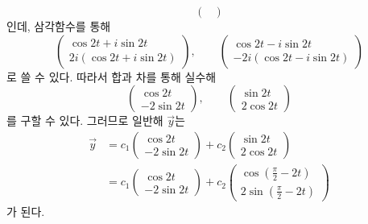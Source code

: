 \documentclass[../engineering_mathematics_lecture_note.tex]{subfiles}
\begin{document}
\begin{enumerate}
\begin{equation*}
\begin{pmatrix}
            \end{pmatrix}
        \end{equation*}
        인데, 삼각함수를 통해
        \begin{equation*}
            \begin{pmatrix}
                \cos 2t + i \sin 2t\\
                2i(\cos 2t + i \sin 2t)
            \end{pmatrix}, \qquad \begin{pmatrix}
                \cos 2t - i \sin 2t\\
                -2i (\cos 2t - i \sin 2t)
            \end{pmatrix}
        \end{equation*}
        로 쓸 수 있다.
        따라서 합과 차를 통해 실수해
        \begin{equation*}
            \begin{pmatrix}
                \cos 2t\\
                -2 \sin 2t
            \end{pmatrix}, \qquad \begin{pmatrix}
                \sin 2t\\
                2\cos 2t
            \end{pmatrix}
        \end{equation*}
        를 구할 수 있다.
        그러므로 일반해 $\vec y$는
        \begin{align*}
            \vec y &= c_1 \begin{pmatrix}
                \cos 2t\\ -2 \sin 2t
            \end{pmatrix} + c_2 \begin{pmatrix}
                \sin 2t\\ 2 \cos 2t
            \end{pmatrix}\\
                   &= c_1 \begin{pmatrix}
                \cos 2t\\ -2 \sin 2t
            \end{pmatrix} + c_2 \begin{pmatrix}
            \cos \left( \frac{\pi}{2} - 2t \right)\\ 2 \sin \left( \frac{\pi}{2} -2t \right)
        \end{pmatrix}
        \end{align*}
        가 된다.


\end{enumerate}
\end{document}
